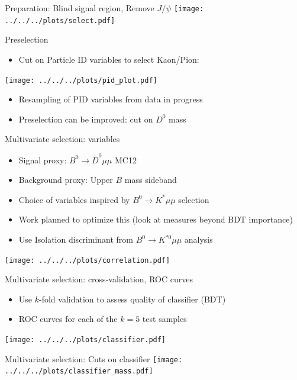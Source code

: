 \documentclass[compress,aspectratio=43]{beamer}
\begin{document}
\begin{frame}{Preparation: Blind signal region, Remove $J/\psi$}
  \centering
  \texttt{[image: ../../../plots/select.pdf]}
\end{frame}

\begin{frame}{Preselection}
  \begin{itemize}
    \item {\small Cut on Particle ID variables to select Kaon/Pion:}
  \end{itemize}
  \centering
  \texttt{[image: ../../../plots/pid\_plot.pdf]}
  \begin{itemize}
    \item Resampling of PID variables from data in progress
    \item Preselection can be improved: cut on $D^0$ mass
  \end{itemize}
\end{frame}

\begin{frame}[shrink=20]{Multivariate selection: variables}
  \begin{itemize}
    \item Signal proxy: $B^0\to \overline{D}^0\mu\mu$ MC12
    \item Background proxy: Upper $B$ mass sideband
    \item Choice of variables inspired by $B^0\to K^*\mu\mu$ selection
    \item Work planned to optimize this (look at measures beyond BDT importance)
    \item Use Isolation discriminant from $B^0\to K^{*0}\mu\mu$ analysis
  \end{itemize}
  \centering
  \texttt{[image: ../../../plots/correlation.pdf]}
\end{frame}

\begin{frame}[shrink=20]{Multivariate selection: cross-validation, ROC curves}
  \begin{itemize}
    \item Use $k$-fold validation to assess quality of classifier (BDT)
    \item ROC curves for each of the $k=5$ test samples
  \end{itemize}

  \centering
  \texttt{[image: ../../../plots/classifier.pdf]}
\end{frame}

\begin{frame}{Multivariate selection: Cuts on classifier}
  \centering
  \texttt{[image: ../../../plots/classifier\_mass.pdf]}
\end{frame}
\end{document}

